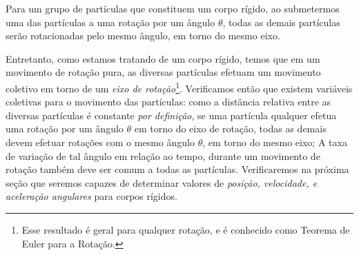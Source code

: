 \begin{marginfigure}[-4cm]
\centering
{}
\caption{Para um grupo de partículas que constituem um corpo rígido, ao submetermos uma das partículas a uma rotação por um ângulo $\theta$, todas as demais partículas serão rotacionadas pelo mesmo ângulo, em torno do mesmo eixo.}
\end{marginfigure}

Entretanto, como estamos tratando de um corpo rígido, temos que em um movimento de rotação pura, as diversas partículas efetuam um movimento coletivo em torno de um \emph{eixo de rotação}\footnote{Esse resultado é geral para qualquer rotação, e é conhecido como Teorema de Euler para a Rotação.}. Verificamos então que existem variáveis coletivas para o movimento das partículas: como a distância relativa entre as diversas partículas é constante \emph{por definição}, se uma partícula qualquer efetua uma rotação por um ângulo $\theta$ em torno do eixo de rotação, todas as demais devem efetuar rotações com o mesmo ângulo $\theta$, em torno do mesmo eixo; A taxa de variação de tal ângulo em relação ao tempo, durante um movimento de rotação também deve ser comum a todas as partículas. Verificaremos na próxima seção que seremos capazes de determinar valores de \emph{posição, velocidade, e aceleração angulares} para corpos rígidos.

